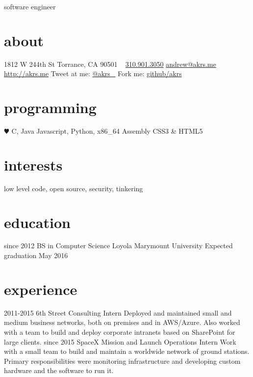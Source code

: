 \documentclass[]{akers-cv}
\begin{document}
       {software engineer}


\begin{aside}
  \section{about}
    1812 W 244th St
    Torrance, CA 90501
    ~
    \href{tel:13109013050}{310.901.3050}
    \href{mailto:andrew@akrs.me}{andrew@akrs.me}
    \href{http://akrs.me}{http://akrs.me}
    Tweet at me: \href{http://twitter.com/akrs_}{@akrs\_}
    Fork me: \href{http://github.com/akrs}{github/akrs}
  \section{programming}
    {\color{red} $\varheartsuit$} C, Java
    Javascript, Python, x86\_64 Assembly
    CSS3 \& HTML5
\end{aside}

\section{interests}

low level code, open source, security, tinkering

\section{education}

\begin{entrylist}
  \entry
    {since 2012}
    {BS in Computer Science}
    {Loyola Marymount University}
    {Expected graduation May 2016}
\end{entrylist}

\section{experience}

\begin{entrylist}
  \entry
    {2011-2015}
    {6th Street Consulting}
    {Intern}
    {Deployed and maintained small and medium business networks, both on premises and in AWS/Azure. Also worked with a team to build and deploy corporate intranets based on SharePoint for large clients.}
  \entry
    {since 2015}
    {SpaceX}
    {Mission and Launch Operations Intern}
    {Work with a small team to build and maintain a worldwide network of ground stations. Primary responsibilities were monitoring infrastructure and developing custom hardware and the software to run it.}
\end{entrylist}
\end{document}
